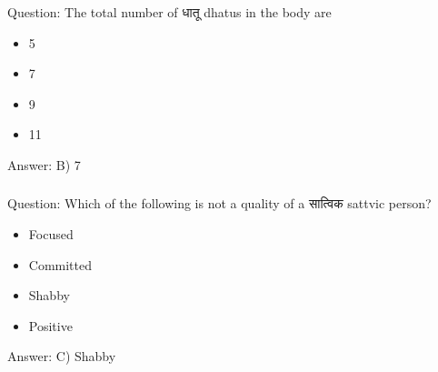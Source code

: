 \begin{frame}[fragile]\frametitle{}

Question: The total number of धातू dhatus in the body are

\begin{itemize}
\item[A)] 5
\item[B)] 7
\item[C)] 9
\item[D)] 11
\end{itemize}

Answer: B) 7
\end{frame}

%
%
%

\begin{frame}[fragile]\frametitle{}

Question: Which of the following is not a quality of a सात्विक  sattvic person?

\begin{itemize}
\item[A)] Focused
\item[B)] Committed
\item[C)] Shabby
\item[D)] Positive
\end{itemize}

Answer: C) Shabby
\end{frame}

%
%
%

